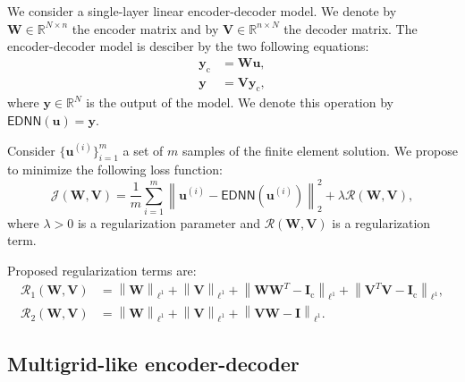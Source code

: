 We consider a single-layer linear encoder-decoder model.
We denote by \(\mathbf{W} \in \mathbb{R}^{N \times n}\) the encoder matrix and by \(\mathbf{V} \in \mathbb{R}^{n \times N}\) the decoder matrix.
The encoder-decoder model is desciber by the two following equations:
\begin{subequations}
    \begin{align}
        \mathbf{y}_\mathrm{c} & = \mathbf{W} \mathbf{u}, \\
        \mathbf{y} & = \mathbf{V} \mathbf{y}_\mathrm{c},
    \end{align}
\end{subequations}
where \(\mathbf{y} \in \mathbb{R}^{N}\) is the output of the model.
We denote this operation by \(\mathsf{EDNN}(\mathbf{u}) = \mathbf{y}\).

Consider \( \{ \mathbf{u}^{(i)} \}_{i=1}^{m} \) a set of \(m\) samples of the finite element solution.
We propose to minimize the following loss function:
\begin{equation}
    \mathcal{J}(\mathbf{W}, \mathbf{V}) =
    \frac{1}{m} \sum_{i=1}^{m} \left\| \mathbf{u}^{(i)} - \mathsf{EDNN}(\mathbf{u}^{(i)}) \right\|_2^2 +
    \lambda \mathcal{R}(\mathbf{W}, \mathbf{V}),
\end{equation}
where \(\lambda > 0\) is a regularization parameter and \(\mathcal{R}(\mathbf{W}, \mathbf{V})\) is a regularization term.

Proposed regularization terms are:
\begin{subequations}
    \begin{align}
        \mathcal{R}_1(\mathbf{W}, \mathbf{V}) &
        = \left\lVert \mathbf{W} \right\rVert_{\ell^1} + \left\lVert \mathbf{V} \right\rVert_{\ell^1}
        + \left\lVert \mathbf{W} \mathbf{W}^T - \mathbf{I}_\mathrm{c} \right\rVert_{\ell^1}
        + \left\lVert \mathbf{V}^T \mathbf{V} - \mathbf{I}_\mathrm{c} \right\rVert_{\ell^1}, \\
        \mathcal{R}_2(\mathbf{W}, \mathbf{V}) &
        = \left\lVert \mathbf{W} \right\rVert_{\ell^1} + \left\lVert \mathbf{V} \right\rVert_{\ell^1}
        + \left\lVert \mathbf{V} \mathbf{W} - \mathbf{I} \right\rVert_{\ell^1}.
    \end{align}
\end{subequations}

\subsection{Multigrid-like encoder-decoder}


